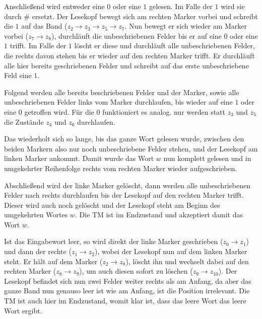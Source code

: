 \documentclass[10pt,a4paper,oneside,ngerman,numbers=noenddot]{scrartcl}
\begin{document}
Anschließend wird entweder eine $0$ oder eine $1$ gelesen. Im Falle der $1$ wird sie durch $\#$ ersetzt. Der Lesekopf bewegt sich am rechten Marker vorbei und schreibt die $1$ auf das Band ($z_{2} \rightarrow z_{3} \rightarrow z_{5} \rightarrow z_{7}$. Nun bewegt er sich wieder am Marker vorbei ($z_{7} \rightarrow z_{8}$), durchläuft die unbeschriebenen Felder bis er auf eine $0$ oder eine $1$ trifft. Im Falle der $1$ löscht er diese und durchläuft alle unbeschriebenen Felder, die rechts davon stehen bis er wieder auf den rechten Marker trifft. Er durchläuft alle hier bereits geschriebenen Felder und schreibt auf das erste unbeschriebene Feld eine $1$.

Folgend werden alle bereits beschriebenen Felder und der Marker, sowie alle unbeschriebenen Felder links vom Marker durchlaufen, bis wieder auf eine $1$ oder eine $0$ getroffen wird. Für die $0$ funktioniert es analog. nur werden statt $z_{3}$ und $z_{5}$ die Zustände $z_{4}$ und $z_{6}$ durchlaufen.

Das wiederholt sich so lange, bis das ganze Wort gelesen wurde, zwischen den beiden Markern also nur noch unbeschriebene Felder stehen, und der Lesekopf am linken Marker ankommt.
Damit wurde das Wort $w$ nun komplett gelesen und in umgekehrter Reihenfolge rechts vom rechten Marker wieder aufgeschrieben.

Abschließend wird der linke Marker gelöscht, dann werden alle unbeschriebenen Felder nach rechts durchlaufen bis der Lesekopf auf den rechten Marker trifft. Dieser wird auch noch gelöscht und der Lesekopf steht am Beginn des umgekehrten Wortes $w$. Die TM ist im Endzustand und akzeptiert damit das Wort $w$.

Ist das Eingabewort leer, so wird direkt der linke Marker geschrieben ($z_{0} \rightarrow z_{1}$) und dann der rechte ($z_{1} \rightarrow z_{2}$), wobei der Lesekopf nun auf dem linken Marker steht. Er hält auf dem Marker ($z_{2} \rightarrow z_{8}$), löscht ihn und wechselt dabei auf den rechten Marker ($z_{8} \rightarrow z_{9}$), um auch diesen sofort zu löschen ($z_{9} \rightarrow z_{10}$). Der Lesekopf befindet sich nun zwei Felder weiter rechts als am Anfang, da aber das ganze Band nun genauso leer ist wie am Anfang, ist die Position irrelevant. Die TM ist auch hier im Endzustand, womit klar ist, dass das leere Wort das leere Wort ergibt.
\pagebreak
\section{} %
\end{document}

